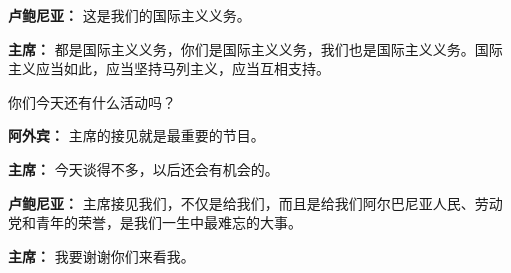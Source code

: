 \begin{duihua}
\item[\textbf{卢鲍尼亚：}] 这是我们的国际主义义务。

\item[\textbf{主席：}] 都是国际主义义务，你们是国际主义义务，我们也是国际主义义务。国际主义应当如此，应当坚持马列主义，应当互相支持。

你们今天还有什么活动吗？

\item[\textbf{阿外宾：}] 主席的接见就是最重要的节目。

\item[\textbf{主席：}] 今天谈得不多，以后还会有机会的。

\item[\textbf{卢鲍尼亚：}] 主席接见我们，不仅是给我们，而且是给我们阿尔巴尼亚人民、劳动党和青年的荣誉，是我们一生中最难忘的大事。

\item[\textbf{主席：}] 我要谢谢你们来看我。
\end{duihua}

